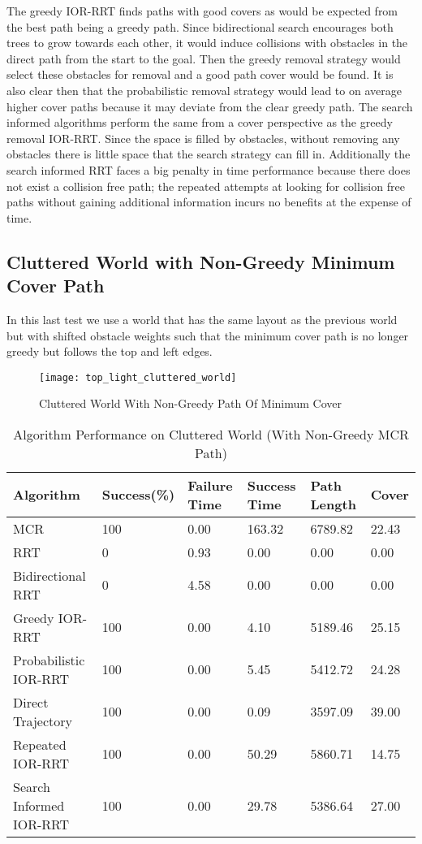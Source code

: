 The greedy IOR-RRT finds paths with good covers as would be expected from the best path being a greedy path. Since bidirectional search encourages both trees to grow towards each other, it would induce collisions with obstacles in the direct path from the start to the goal. Then the greedy removal strategy would select these obstacles for removal and a good path cover would be found. It is also clear then that the probabilistic removal strategy would lead to on average higher cover paths because it may deviate from the clear greedy path. The search informed algorithms perform the same from a cover perspective as the greedy removal IOR-RRT. Since the space is filled by obstacles, without removing any obstacles there is little space that the search strategy can fill in. Additionally the search informed RRT faces a big penalty in time performance because there does not exist a collision free path; the repeated attempts at looking for collision free paths without gaining additional information incurs no benefits at the expense of time.


\subsection{Cluttered World with Non-Greedy Minimum Cover Path}
In this last test we use a world that has the same layout as the previous world but with shifted obstacle weights such that the minimum cover path is no longer greedy but follows the top and left edges. 

\begin{figure}[h!]
    \centering
    \texttt{[image: top\_light\_cluttered\_world]}
    \caption{Cluttered World With Non-Greedy Path Of Minimum Cover}
    \label{fig:top_light_cluttered_world}
\end{figure}

\begin{table}[h!]
\centering
\begin{tabular}{@{}llllll@{}}
\toprule
Algorithm & Success(\%)  & Failure Time  & Success Time  & Path Length & Cover\\ 
\midrule
MCR & 100 & 0.00 & 163.32 & 6789.82 & 22.43 \\
RRT & 0 & 0.93 & 0.00 & 0.00 & 0.00 \\
Bidirectional RRT & 0 & 4.58 & 0.00 & 0.00 & 0.00 \\
Greedy IOR-RRT & 100 & 0.00 & 4.10 & 5189.46 & 25.15 \\
Probabilistic IOR-RRT & 100 & 0.00 & 5.45 & 5412.72 & 24.28 \\
Direct Trajectory & 100 & 0.00 & 0.09 & 3597.09 & 39.00 \\
Repeated IOR-RRT & 100 & 0.00 & 50.29 & 5860.71 & 14.75 \\
Search Informed IOR-RRT & 100 & 0.00 & 29.78 & 5386.64 & 27.00 \\
\bottomrule
\end{tabular}
\caption{Algorithm Performance on Cluttered World (With Non-Greedy MCR Path)}
\label{tab:top_light_cluttered_world}
\end{table}

